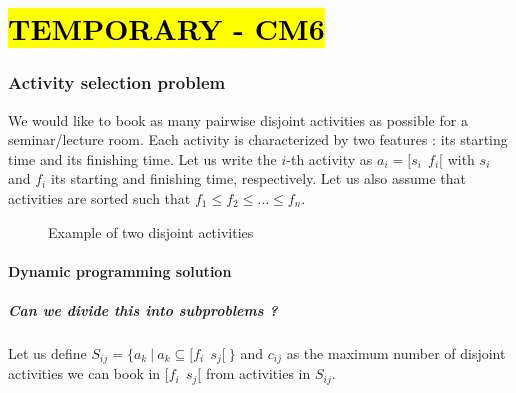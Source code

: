 \part*{\hl{TEMPORARY - CM6}}

\section{Activity selection problem} 
We would like to book as many pairwise disjoint activities as possible for a seminar/lecture room.
Each activity is characterized by two features : its starting time and its finishing time. Let us write the $i$-th activity as $a_i = [s_i \: \:  f_i[$ with $s_i$ and $f_i$ its starting and finishing time, respectively. Let us also assume that activities are sorted such that $f_1 \leq f_2 \leq \ldots \leq f_n$.

\begin{figure}[h!]
\centering
{}
\caption{Example of two disjoint activities}
\end{figure}

\subsection{Dynamic programming solution}
\subsubsection{Can we divide this into subproblems ?}

Let us define $S_{ij} = \{ a_k \: | \: a_k \subseteq [f_i \: \: s_j [ \: \}$ and $c_{ij}$ as the maximum number of disjoint activities we can book in $[f_i \: \: s_j [$  from activities in $S_{ij}$.

